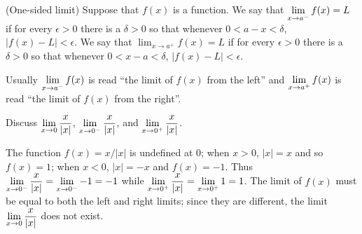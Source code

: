\begin{definition} (One-sided limit) Suppose that $f(x)$ is a function. We say that
$\displaystyle \lim_{x\to a^-}f(x)=L$ if for every $\epsilon>0$ there is a $\delta >
0$ so that whenever $0 < a-x < \delta$, $|f(x)-L|<\epsilon$.  We say
that $\lim_{x\to a^+}f(x)=L$ if for every $\epsilon>0$ there is a
$\delta > 0$ so that whenever $0 < x-a < \delta$, $|f(x)-L|<\epsilon$.
\end{definition}

Usually $\displaystyle \lim_{x\to a^-}f(x)$ is read ``the limit of $f(x)$ from the
left'' and $\displaystyle \lim_{x\to a^+}f(x)$ is read ``the limit of $f(x)$ from the
right''.

\begin{example}
Discuss $\displaystyle\lim_{x\to 0}{x\over|x|}$, 
$\displaystyle\lim_{x\to 0^-}{x\over|x|}$,
and $\displaystyle\lim_{x\to 0^+}{x\over|x|}$.

The function $f(x)=x/|x|$ is undefined at 0; when $x>0$, $|x|=x$ and
so $f(x)=1$; when $x<0$, $|x|=-x$ and $f(x)=-1$. Thus
$\displaystyle \lim_{x\to 0^-}{x\over|x|}=\lim_{x\to 0^-}-1=-1$ while 
$\displaystyle \lim_{x\to 0^+}{x\over|x|}=\lim_{x\to 0^+}1=1$. The limit of $f(x)$
must be equal to both the left and right limits; since they are
different, the limit $\displaystyle \lim_{x\to 0}{x\over|x|}$ does not exist.
\end{example}

